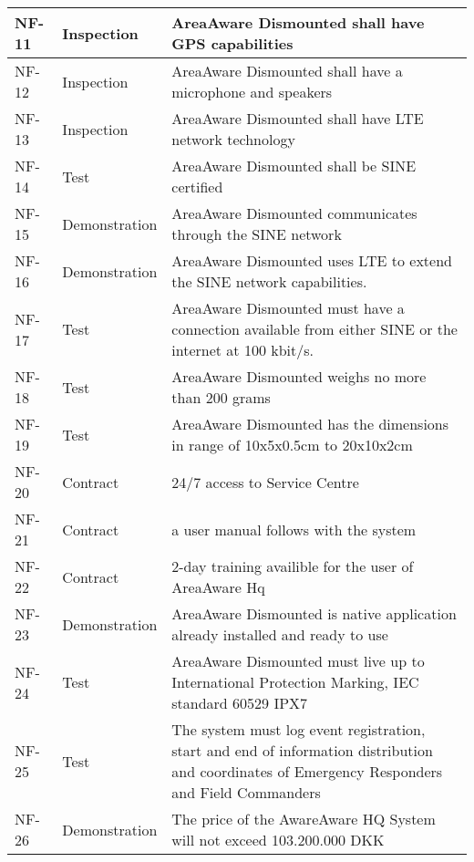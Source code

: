 \begin{longtable}{| p{2.4cm}  | p{2.6cm} | p{6.6cm} |  }
	NF-11	& Inspection	& AreaAware Dismounted shall have GPS capabilities \\ \hline
	NF-12	& Inspection	& AreaAware Dismounted shall have a microphone and speakers \\ \hline
	NF-13	& Inspection	& AreaAware Dismounted shall have LTE network technology \\ \hline
	NF-14	& Test			& AreaAware Dismounted shall be SINE certified \\ \hline
	NF-15	& Demonstration	& AreaAware Dismounted communicates through the SINE network \\ \hline
	NF-16	& Demonstration	& AreaAware Dismounted uses LTE to extend the SINE network capabilities. \\ \hline
	NF-17	& Test			& AreaAware Dismounted must have a connection available from either SINE or the internet at 100 kbit/s. \\ \hline
	NF-18	& Test			& AreaAware Dismounted  weighs no more than 200 grams\\ \hline
	NF-19	& Test			& AreaAware Dismounted  has the dimensions in range of 10x5x0.5cm to 20x10x2cm\\ \hline
	NF-20	& Contract		& 24/7 access to Service Centre\\ \hline
	NF-21	& Contract		& a user manual follows with the system\\ \hline
	NF-22	& Contract		& 2-day training availible for the user of AreaAware Hq \\ \hline
	NF-23	& Demonstration	& AreaAware Dismounted is native application already installed and ready to use \\ \hline
	NF-24   & Test 			& AreaAware Dismounted must live up to International Protection Marking, IEC standard 60529 IPX7 \\ 
	NF-25   & Test          & The system must log event registration, start and end of information distribution and coordinates of Emergency Responders and Field Commanders \\ \hline \hline
	NF-26	& Demonstration	& The price of the AwareAware HQ System will not exceed 103.200.000 DKK \\ \hline

\end{longtable}